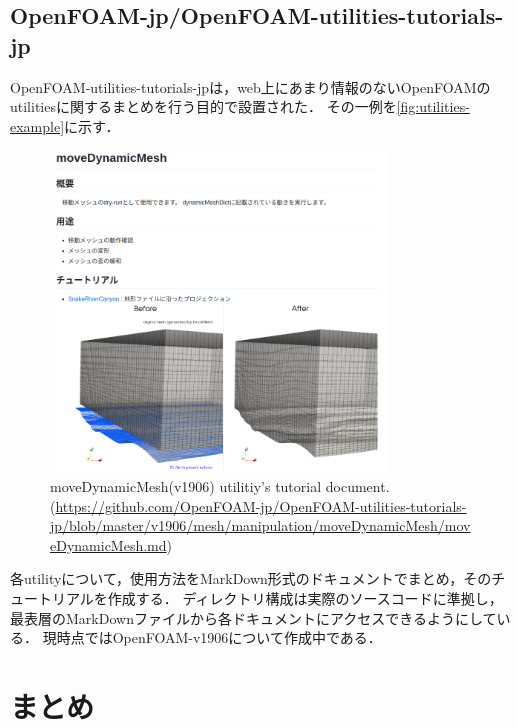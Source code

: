 \documentclass{ltjoc}
\begin{document}
\subsection{OpenFOAM-jp/OpenFOAM-utilities-tutorials-jp}
OpenFOAM-utilities-tutorials-jp\cite{URL:OpenFOAM-jp-OpenFOAM-utilities-tutorials-jp}は，web上にあまり情報のないOpenFOAMのutilitiesに関するまとめを行う目的で設置された．
その一例を\autoref{fig:utilities-example}に示す．
\begin{figure}[htbp]
\centering
\includegraphics[width=0.8\textwidth]{fig/utilities-example.png}
\caption{moveDynamicMesh(v1906) utilitiy's tutorial document.(\href{link}{https://github.com/OpenFOAM-jp/OpenFOAM-utilities-tutorials-jp/blob/master/v1906/mesh/manipulation/moveDynamicMesh/moveDynamicMesh.md})}
\label{fig:utilities-example}
\end{figure}
各utilityについて，使用方法をMarkDown形式のドキュメントでまとめ，そのチュートリアルを作成する．
ディレクトリ構成は実際のソースコードに準拠し，最表層のMarkDownファイルから各ドキュメントにアクセスできるようにしている．\cite{URL:OpenFOAM-jp-util-index}
現時点ではOpenFOAM-v1906について作成中である．
%
\section{まとめ}


\end{document}
